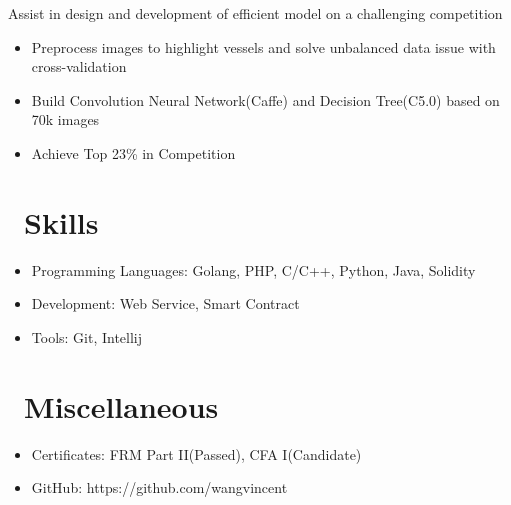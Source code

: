 \documentclass{resume}
\begin{document}
Assist in design and development of efficient model on a challenging competition
\begin{itemize}
  \item Preprocess images to highlight vessels and solve unbalanced data issue with cross-validation
  \item Build Convolution Neural Network(Caffe) and Decision Tree(C5.0) based on 70k images
  \item Achieve Top 23\% in Competition
\end{itemize}


\section{\faCogs\ Skills}
\begin{itemize}[parsep=0.5ex]
  \item Programming Languages: Golang, PHP, C/C++, Python, Java, Solidity
  \item Development: Web Service, Smart Contract
  \item Tools: Git, Intellij
\end{itemize}

\section{\faInfo\ Miscellaneous}
\begin{itemize}[parsep=0.5ex]
  \item Certificates: FRM Part II(Passed), CFA I(Candidate)
  \item GitHub: https://github.com/wangvincent
\end{itemize}

%
%
\end{document}
